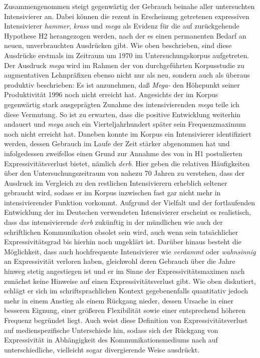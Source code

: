 Zusammengenommen steigt gegenwärtig der Gebrauch beinahe aller untersuchten Intensivierer an. Dabei können die rezent in Erscheinung getretenen expressiven Intensivierer \textit{hammer}, \textit{krass} und \textit{mega} als Evidenz für die auf \citet[274]{Baumgarten.1908} zurückgehende Hypothese H2 herangezogen werden, nach der es einen permanenten Bedarf an neuen, unverbrauchten Ausdrücken gibt. Wie oben beschrieben, sind diese Ausdrücke erstmals im Zeitraum um 1970 im Untersuchungskorpus aufgetreten. Der Ausdruck \textit{mega} wird im Rahmen der von \citet[345]{Ruf.1996} durchgeführten Korpusstudie zu augmentativen Lehnpräfixen ebenso nicht nur als neu, sondern auch als überaus produktiv beschrieben: \glqq{}Es ist \textelp{} anzunehmen, daß \textit{Mega-} den Höhepunkt seiner Produktivität 1996 noch nicht erreicht hat.\grqq{} Angesichts der im Korpus gegenwärtig stark ausgeprägten Zunahme des intensivierenden \textit{mega} teile ich diese Vermutung. So ist zu erwarten, dass die positive Entwicklung weiterhin andauert und \textit{mega} auch ein Vierteljahrhundert später sein Frequenzmaximum noch nicht erreicht hat. Daneben konnte im Korpus ein Intensivierer identifiziert werden, dessen Gebrauch im Laufe der Zeit stärker abgenommen hat und infolgedessen zweifellos einen Grund zur Annahme des von \citet[2]{Hauschild.1899} in H1 postulierten Expressivitätsverlust bietet, nämlich \textit{derb}. Hier geben die relativen Häufigkeiten über den Untersuchungszeitraum von nahezu 70 Jahren zu verstehen, dass der Ausdruck im Vergleich zu den restlichen Intensivierern erheblich seltener gebraucht wird, sodass er im Korpus inzwischen fast gar nicht mehr in intensivierender Funktion vorkommt. Aufgrund der Vielfalt und der fortlaufenden Entwicklung der im Deutschen verwendeten Intensivierer erscheint es realistisch, dass das intensivierende \textit{derb} zukünftig in der mündlichen wie auch der schriftlichen Kommunikation obsolet sein wird, auch wenn sein tatsächlicher Expressivitätsgrad bis hierhin noch ungeklärt ist. Darüber hinaus besteht die Möglichkeit, dass auch hochfrequente Intensivierer wie \textit{verdammt} oder \textit{wahnsinnig} an Expressivität verloren haben, gleichwohl deren Gebrauch über die Jahre hinweg stetig angestiegen ist und er im Sinne der Expressivitätsmaximen nach \citet[]{Kirschbaum.2002b} zunächst keine Hinweise auf einen Expressivitätsverlust gibt. Wie oben diskutiert, schlägt er sich im schriftsprachlichen Kontext gegebenenfalls quantitativ jedoch mehr in einem Anstieg als einem Rückgang nieder, dessen Ursache in einer besseren Eignung, einer größeren Flexibilität sowie einer entsprechend höheren Frequenz begründet liegt. Auch weist diese Definition von Expressivitätsverlust auf medienspezifische Unterschiede hin, sodass sich der Rückgang von Expressivität in Abhängigkeit des Kommunikationsmediums nach \citet[]{Koch.1996,Koch.2007} auf unterschiedliche, vielleicht sogar divergierende Weise ausdrückt.

